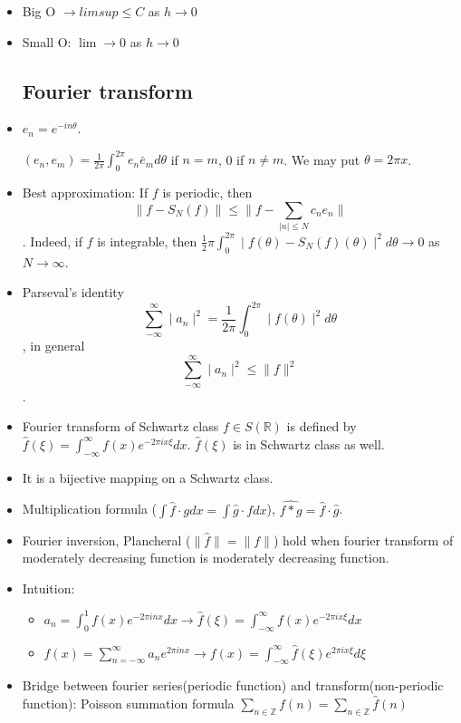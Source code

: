 \documentclass{article}
\theoremstyle{remark}
\begin{document}
\newpage
\begin{itemize}
\section*{Digression}
\subsection*{Big O, small O}
    \item Big O $\to limsup\leq C$ as $h\to 0$
    \item Small O: $\lim\to 0$ as $h\to 0$
\subsection*{Fourier transform}
    \item $e_n=e^{-in\theta}$. 
    
    $(e_n, e_m)=\frac 1{2\pi}\int^{2\pi}_0 e_n\bar e_md\theta$ if $n=m$, 0 if $n\neq m$. We may put $\theta=2\pi x$.
    \item Best approximation: If $f$ is periodic, then $$\lVert f-S_N (f)\rVert\leq \lVert f-\sum_{\mid n\mid\leq N}c_ne_n\lVert$$. Indeed, if $f$ is integrable, then $\frac 1 2\pi\int^{2\pi}_0\mid f(\theta)-S_N (f)(\theta)\mid^2d\theta\to 0$ as $N\to \infty$.
    \item Parseval's identity
    $$\sum^\infty_{-\infty}\mid a_n\mid^2=\frac 1 {2\pi}\int^{2\pi}_0 \mid f(\theta)\mid^2 d\theta$$, in general $$\sum^\infty_{-\infty}\mid a_n\mid^2\leq \lVert f\rVert ^2$$.
    \item Fourier transform of Schwartz class $f\in S(\mathbb{R})$ is defined by $\hat f(\xi)=\int^\infty_{-\infty}f(x)e^{-2\pi ix\xi}dx$. $\hat f(\xi)$ is in Schwartz class as well.
    \item It is a bijective mapping on a Schwartz class. 
    \item Multiplication formula ($\int \hat f \cdot gdx=\int \hat g\cdot fdx$), $\hat{f*g}=\hat f\cdot\hat g$.
    \item Fourier inversion, Plancheral ($\lVert \hat f\rVert=\lVert f\rVert$) hold when fourier transform of moderately decreasing function is moderately decreasing function. 
    \item Intuition:
    \begin{itemize}
        \item $a_n=\int^1_0 f(x)e^{-2\pi inx}dx\to \hat f(\xi)=\int^\infty_{-\infty} f(x)e^{-2\pi ix\xi}dx$
        \item $f(x)=\sum^\infty_{n=-\infty}a_n e^{2\pi inx}\to f(x)=\int ^\infty_{-\infty}\hat f(\xi)e^{2\pi ix\xi}d\xi$
    \end{itemize}
    \item Bridge between fourier series(periodic function) and transform(non-periodic function): Poisson summation formula $\sum_{n\in\mathbb{Z}}f(n)=\sum_{n\in\mathbb{Z}}\hat f(n)$
    \end{itemize}
\end{document}
